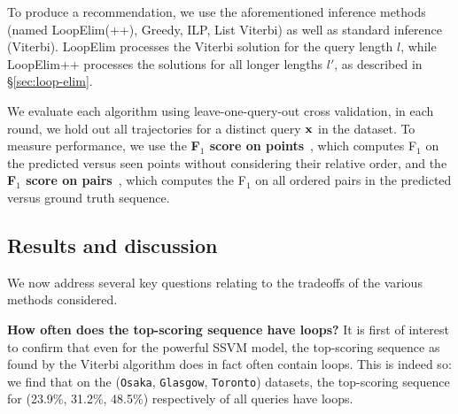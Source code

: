 %

To produce a recommendation,
we use 
the aforementioned inference methods (named {\sc LoopElim(++)}, {\sc Greedy}, {\sc ILP}, {\sc List Viterbi})
as well as
standard inference ({\sc Viterbi}).
{\sc LoopElim} processes the Viterbi solution for the query length $l$,
while {\sc LoopElim++} processes the solutions for all longer lengths $l'$, as described in \S\ref{sec:loop-elim}.

We evaluate each algorithm using leave-one-query-out cross validation,
\ie in each round, we hold out all trajectories for a distinct query $\mathbf{x}$ in the dataset.
To measure performance,
we use 
the {\bf F$_1$ score on points}~\cite{ijcai15}, which computes F$_1$ on the predicted versus seen points
without considering their relative order,
and the {\bf F$_1$ score on pairs}~\cite{cikm16paper}, which computes the F$_1$ on all ordered pairs in the predicted versus ground truth sequence. %




%
\subsection{Results and discussion}

We now address several key questions relating to the tradeoffs of the various methods considered.

\textbf{How often does the top-scoring sequence have loops?}
It is first of interest to confirm that
even for the powerful SSVM model,
the top-scoring sequence as found by the Viterbi algorithm does in fact often contain loops.
This is indeed so: we find that on the ({\tt Osaka}, {\tt Glasgow}, {\tt Toronto}) datasets, the top-scoring sequence for (23.9\%, 31.2\%, 48.5\%) respectively of all queries have loops.

